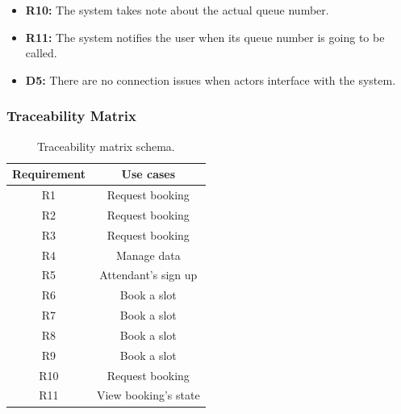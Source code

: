 \documentclass[table, 12pt]{article}
\begin{document}
\begin{flushleft}
\begin{enumerate}[label=\textbf{-G\arabic*}:]
{              \begin{itemize}
                  \item \textbf{R10:} The system takes note about the actual queue number.
                  \item \textbf{R11:} The system notifies the user when its queue number is going to be called.
                  \item \textbf{D5:} There are no connection issues when actors interface with the system.
              \end{itemize}
              }
    \end{enumerate}


    \subsubsection{Traceability Matrix}
    \begin{table}[H]
        \begin{center}
            \begin{tabular}{|c| c|}
                \hline
                \textbf{Requirement} & \textbf{Use cases}   \\
                \hline
                R1                   & Request booking      \\
                R2                   & Request booking      \\
                R3                   & Request booking      \\
                R4                   & Manage data          \\
                R5                   & Attendant's sign up  \\
                R6                   & Book a slot          \\
                R7                   & Book a slot          \\
                R8                   & Book a slot          \\
                R9                   & Book a slot          \\
                R10                  & Request booking      \\
                R11                  & View booking's state \\
                \hline
            \end{tabular}
            \caption{Traceability matrix schema.}
        \end{center}
    \end{table}




\end{flushleft}
\end{document}
